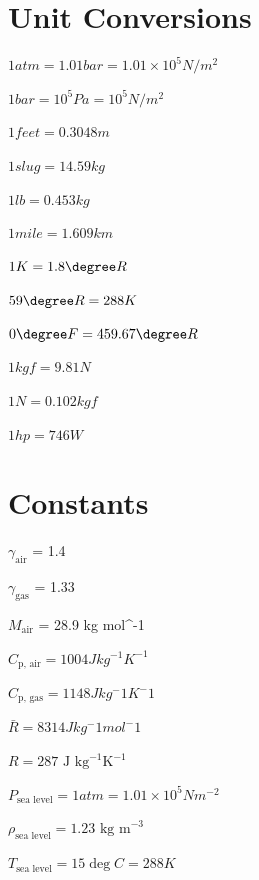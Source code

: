\section{Unit Conversions}

$1 atm = 1.01bar = 1.01 \times 10^5 N/m^2$

$1 bar = 10^5 Pa = 10^5 N/m^2$

$1 feet = 0.3048m$

$1 slug = 14.59kg$

$1lb = 0.453kg $

$1 mile = 1.609km$

$1K = 1.8\degree R$

$59 \degree R = 288K $

$ 0\degree F = 459.67 \degree R$

$1 kgf = 9.81N $

$1N = 0.102 kgf$

$1hp = 746W$

\section{Constants}

$\gamma_\text{air}$ = 1.4

$\gamma_\text{gas}$ = 1.33

$M_\text{air}$ = 28.9 kg mol^{-1}

$C_\text{p, air} = 1004 J kg^{-1} K^{-1}$

$C_\text{p, gas} = 1148 J kg^-1 K^-1$

$\bar{R} = 8314 J  kg^-1 mol^-1$

$R = 287 \text{ J kg}^{-1} \text{K}^{-1}$

$P_\text{sea level} = 1 atm = 1.01\times 10^5 Nm^{-2}$

$\rho_\text{sea level} = 1.23 \text{ kg m}^{-3}$

$T_\text{sea level} = 15 \deg C = 288K$